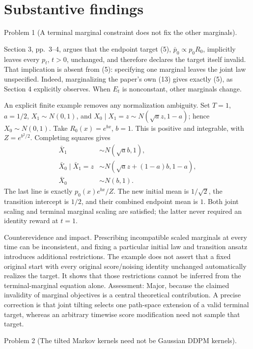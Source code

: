 \documentclass[10pt]{article}
\begin{document}
\section*{Substantive findings}
Problem 1 (A terminal marginal constraint does not fix the other marginals).\par
Section 3, pp. 3–4, argues that the endpoint target (5), \(\bar p_0\propto p_0R_0\), implicitly leaves every \(p_t\), \(t>0\), unchanged, and therefore declares the target itself invalid. That implication is absent from (5): specifying one marginal leaves the joint law unspecified. Indeed, marginalizing the paper’s own (13) gives exactly (5), as Section 4 explicitly observes. When \(E_t\) is nonconstant, other marginals change.\par
An explicit finite example removes any normalization ambiguity. Set \(T=1\), \(a=1/2\), \(X_1\sim N(0,1)\), and \(X_0\mid X_1=z\sim N(\sqrt a z,1-a)\); hence \(X_0\sim N(0,1)\). Take \(R_0(x)=e^{bx}\), \(b=1\). This is positive and integrable, with \(Z=e^{b^2/2}\). Completing squares gives \[\begin{aligned}
 \bar X_1&\sim N(\sqrt a b,1),\\
 \bar X_0\mid\bar X_1=z&\sim N(\sqrt a z+(1-a)b,1-a),\\
 \bar X_0&\sim N(b,1).\end{aligned}\] The last line is exactly \(p_0(x)e^{bx}/Z\). The new initial mean is \(1/\sqrt2\), the transition intercept is \(1/2\), and their combined endpoint mean is \(1\). Both joint scaling and terminal marginal scaling are satisfied; the latter never required an identity reward at \(t=1\).\par
Counterevidence and impact. Prescribing incompatible scaled marginals at every time can be inconsistent, and fixing a particular initial law and transition ansatz introduces additional restrictions. The example does not assert that a fixed original start with every original score/noising identity unchanged automatically realizes the target. It shows that those restrictions cannot be inferred from the terminal-marginal equation alone. Assessment: Major, because the claimed invalidity of marginal objectives is a central theoretical contribution. A precise correction is that joint tilting selects one path-space extension of a valid terminal target, whereas an arbitrary timewise score modification need not sample that target.\par
Problem 2 (The tilted Markov kernels need not be Gaussian DDPM kernels).\par
\end{document}
